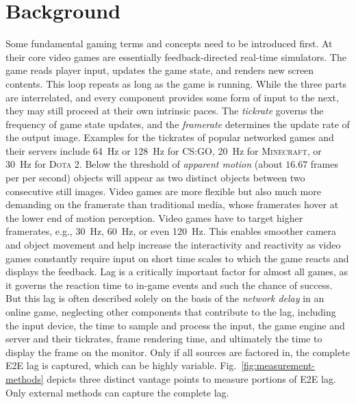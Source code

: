 \section{Background}
\label{sec:background}

Some fundamental gaming terms and concepts need to be introduced first. At their core video games are essentially feedback-directed real-time simulators. The game reads player input, updates the game state, and renders new screen contents. This loop repeats as long as the game is running. While the three parts are interrelated, and every component provides some form of input to the next, they may still proceed at their own intrinsic paces. The \textit{tickrate} governs the frequency of game state updates, and the \textit{framerate} determines the update rate of the output image. Examples for the tickrates of popular networked games and their servers include \SI{64}{\hertz} or \SI{128}{\hertz} for \textsc{CS:GO}, \SI{20}{\hertz} for \textsc{Minecraft}, or \SI{30}{\hertz} for \textsc{Dota 2}. Below the threshold of \textit{apparent motion} (about $16.67$ frames per per second) objects will appear as two distinct objects between two consecutive still images. Video games are more flexible but also much more demanding on the framerate than traditional media, whose framerates hover at the lower end of motion perception. Video games have to target higher framerates, e.g., \SI{30}{\hertz}, \SI{60}{\hertz}, or even \SI{120}{\hertz}. This enables smoother camera and object movement and help increase the interactivity and reactivity as video games constantly require input on short time scales to which the game reacts and displays the feedback. Lag is a critically important factor for almost all games, as it governs the reaction time to in-game events and such the chance of success. But this lag is often described solely on the basis of the \textit{network delay} in an online game, neglecting other components that contribute to the lag, including the input device, the time to sample and process the input, the game engine and server and their tickrates, frame rendering time, and ultimately the time to display the frame on the monitor. Only if all sources are factored in, the complete \gls{E2E} lag is captured, which can be highly variable. Fig.~\ref{fig:measurement-methods} depicts three distinct vantage points to measure portions of \gls{E2E} lag. Only external methods can capture the complete lag.


